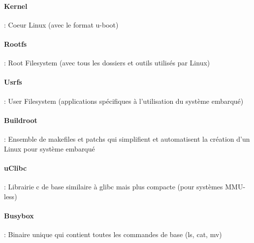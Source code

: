 \documentclass[resume]{subfiles}
\begin{document}
\paragraph{Kernel} : Coeur Linux (avec le format u-boot)
\paragraph{Rootfs} : Root Filesystem (avec tous les dossiers et outils utilisés par Linux)
\paragraph{Usrfs} : User Filesystem (applications spécifiques à l'utilisation du système embarqué)
\paragraph{Buildroot} : Ensemble de makefiles et patchs qui simplifient et automatisent la création d'un Linux pour système embarqué
\paragraph{uClibc} : Librairie c de base similaire à glibc mais plus compacte (pour systèmes MMU-less)
\paragraph{Busybox} : Binaire unique qui contient toutes les commandes de base (ls, cat, mv)
\end{document}
